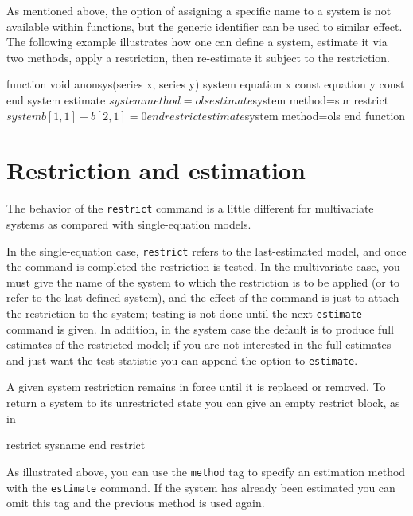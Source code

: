 As mentioned above, the option of assigning a specific name to a
system is not available within functions, but the generic identifier
 can be used to similar effect. The following example
illustrates how one can define a system, estimate it via two methods,
apply a restriction, then re-estimate it subject to the restriction.

\begin{code}
function void anonsys(series x, series y)
     system
         equation x const
         equation y const
     end system
     estimate $system method=ols
     estimate $system method=sur
     restrict $system
         b[1,1] - b[2,1] = 0
     end restrict
     estimate $system method=ols
end function
\end{code}

\section{Restriction and estimation}
\label{sec:sys-est}

The behavior of the \texttt{restrict} command is a little different
for multivariate systems as compared with single-equation models.

In the single-equation case, \texttt{restrict} refers to the
last-estimated model, and once the command is completed the
restriction is tested. In the multivariate case, you must give the
name of the system to which the restriction is to be applied (or
 to refer to the last-defined system), and the effect of
the command is just to attach the restriction to the system; testing
is not done until the next \texttt{estimate} command is given.  In
addition, in the system case the default is to produce full estimates
of the restricted model; if you are not interested in the full
estimates and just want the test statistic you can append the
 option to \texttt{estimate}.

A given system restriction remains in force until it is replaced or
removed. To return a system to its unrestricted state you can give
an empty restrict block, as in

\begin{code}
restrict sysname
end restrict
\end{code}

As illustrated above, you can use the \texttt{method} tag to specify
an estimation method with the \texttt{estimate} command. If the system
has already been estimated you can omit this tag and the previous
method is used again. 

